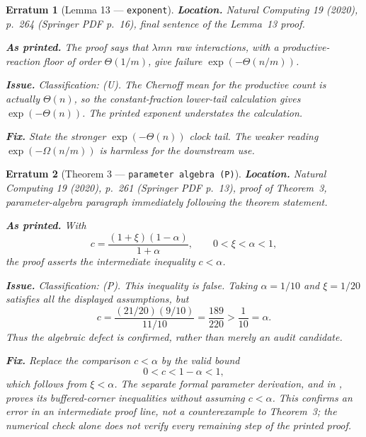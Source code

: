 \documentclass[11pt]{article}
\theoremstyle{erratumstyle}
\newtheorem{erratum}{Erratum}
\begin{document}
\begin{erratum}[Lemma 13 --- \texttt{exponent}]
\textbf{Location.} \emph{Natural Computing} 19 (2020), p.~264
(Springer PDF p.~16), final sentence of the Lemma~13 proof.

\medskip
\textbf{As printed.} The proof says that $\lambda mn$ raw interactions, with
a productive-reaction floor of order $\Theta(1/m)$, give failure
$\exp(-\Theta(n/m))$.

\medskip
\textbf{Issue.} Classification: (U). The Chernoff mean for the productive
count is actually $\Theta(n)$, so the constant-fraction lower-tail calculation
gives $\exp(-\Theta(n))$. The printed exponent understates the calculation.

\medskip
\textbf{Fix.} State the stronger $\exp(-\Theta(n))$ clock tail. The weaker
reading $\exp(-\Omega(n/m))$ is harmless for the downstream use.
\end{erratum}

\begin{erratum}[Theorem 3 --- \texttt{parameter algebra (P)}]
\textbf{Location.} \emph{Natural Computing} 19 (2020), p.~261
(Springer PDF p.~13), proof of Theorem~3, parameter-algebra paragraph
immediately following the theorem statement.

\medskip
\textbf{As printed.} With
\[
  c=\frac{(1+\xi)(1-\alpha)}{1+\alpha},
  \qquad 0<\xi<\alpha<1,
\]
the proof asserts the intermediate inequality $c<\alpha$.

\medskip
\textbf{Issue.} Classification: (P). This inequality is false. Taking
$\alpha=1/10$ and $\xi=1/20$ satisfies all the displayed assumptions, but
\[
  c=\frac{(21/20)(9/10)}{11/10}
    =\frac{189}{220}>\frac1{10}=\alpha.
\]
Thus the algebraic defect is confirmed, rather than merely an audit
candidate.

\medskip
\textbf{Fix.} Replace the comparison $c<\alpha$ by the valid bound
\[
  0<c<1-\alpha<1,
\]
which follows from $\xi<\alpha$. The separate formal parameter derivation,
 and
 in
, proves its buffered-corner inequalities
without assuming $c<\alpha$. This confirms an error in an intermediate
proof line, not a counterexample to Theorem~3; the numerical check alone
does not verify every remaining step of the printed proof.
\end{erratum}
\end{document}
